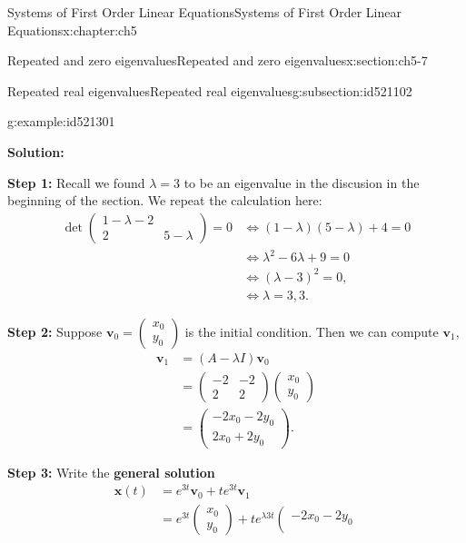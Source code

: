 \documentclass[oneside,10pt,]{book}
\newcommand{\terminology}[1]{\textbf{#1}}
\numberwithin{equation}{section}
\numberwithin{equation}{section}
\newcommand{\amp}{&}
\begin{document}
\begin{chapterptx}{Systems of First Order Linear Equations}{}{Systems of First Order Linear Equations}{}{}{x:chapter:ch5}
\begin{sectionptx}{Repeated and zero eigenvalues}{}{Repeated and zero eigenvalues}{}{}{x:section:ch5-7}
\begin{subsectionptx}{Repeated real eigenvalues}{}{Repeated real eigenvalues}{}{}{g:subsection:id521102}
\begin{example}{}{g:example:id521301}
\par
\terminology{Solution:}%
\par
\terminology{Step 1:} Recall we found \(\lambda=3\) to be an eigenvalue in the discusion in the beginning of the section. We repeat the calculation here:%
\begin{align*}
\det\left(\begin{array}{cc}
1-\lambda  -2\\
2 \amp 5-\lambda
\end{array}\right)=0 
\amp \iff  \left(1-\lambda\right)\left(5-\lambda\right)+4=0\\
\amp \iff  \lambda^{2}-6\lambda+9=0\\
\amp \iff  \left(\lambda-3\right)^{2}=0,\\
\amp \iff \lambda=3,3.
\end{align*}
%
\par
\terminology{Step 2:} Suppose \(\mathbf{v}_{0}=\left(\begin{array}{c}
x_{0}\\
y_{0}
\end{array}\right)\) is the initial condition. Then we can compute \(\mathbf{v}_{1}\),%
\begin{align*}
\mathbf{v}_{1} \amp =  \left(A-\lambda I\right)\mathbf{v}_{0}\\
\amp =  \left(\begin{array}{cc}
-2 \amp -2\\
2 \amp 2
\end{array}\right)\left(\begin{array}{c}
x_{0}\\
y_{0}
\end{array}\right)\\
\amp =  \left(\begin{array}{c}
-2x_{0}-2y_{0}\\
2x_{0}+2y_{0}
\end{array}\right). 
\end{align*}
%
\par
\terminology{Step 3:} Write the \terminology{general solution}%
\begin{align*}
\mathbf{x}(t) \amp =  e^{3t}\mathbf{v}_{0}+te^{3t}\mathbf{v}_{1}\\
\amp =  e^{3t}\left(\begin{array}{c}
x_{0}\\
y_{0}
\end{array}\right)+te^{\lambda3t}\left(\begin{array}{c}
-2x_{0}-2y_{0}\\

\end{array}
\end{align*}
\end{example}
\end{subsectionptx}
\end{sectionptx}
\end{chapterptx}
\end{document}
